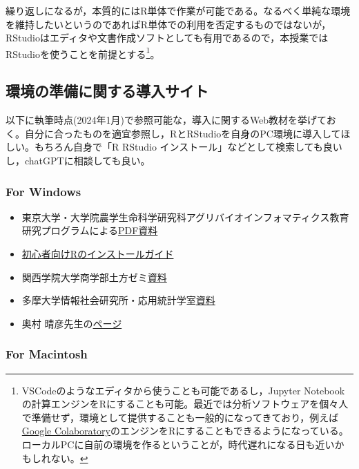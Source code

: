 \documentclass[
  a4paper,
]{ltjsbook}
\providecommand{\tightlist}{%
  \setlength{\itemsep}{0pt}\setlength{\parskip}{0pt}}\usepackage{longtable,booktabs,array}
\begin{document}
繰り返しになるが，本質的にはR単体で作業が可能である。なるべく単純な環境を維持したいというのであればR単体での利用を否定するものではないが，RStudioはエディタや文書作成ソフトとしても有用であるので，本授業ではRStudioを使うことを前提とする\footnote{VSCodeのようなエディタから使うことも可能であるし，Jupyter
  Notebookの計算エンジンをRにすることも可能。最近では分析ソフトウェアを個々人で準備せず，環境として提供することも一般的になってきており，例えば\href{https://colab.research.google.com/}{Google
  Colaboratory}のエンジンをRにすることもできるようになっている。ローカルPCに自前の環境を作るということが，時代遅れになる日も近いかもしれない。}。

\hypertarget{ux74b0ux5883ux306eux6e96ux5099ux306bux95a2ux3059ux308bux5c0eux5165ux30b5ux30a4ux30c8-1}{%
\subsection{環境の準備に関する導入サイト}\label{ux74b0ux5883ux306eux6e96ux5099ux306bux95a2ux3059ux308bux5c0eux5165ux30b5ux30a4ux30c8-1}}

以下に執筆時点(2024年1月)で参照可能な，導入に関するWeb教材を挙げておく。自分に合ったものを適宜参照し，RとRStudioを自身のPC環境に導入してほしい。もちろん自身で「R
RStudio
インストール」などとして検索しても良いし，chatGPTに相談しても良い。

\hypertarget{for-windows-1}{%
\subsubsection{For Windows}\label{for-windows-1}}

\begin{itemize}
\tightlist
\item
  東京大学・大学院農学生命科学研究科アグリバイオインフォマティクス教育研究プログラムによる\href{https://www.iu.a.u-tokyo.ac.jp/textbook/R/R1.010_win.pdf}{PDF資料}
\item
  \href{https://syunsuke.github.io/r_install_guide_for_beginners/}{初心者向けRのインストールガイド}
\item
  関西学院大学商学部土方ゼミ\href{http://soc-research.org/ja/r_install_windows/}{資料}
\item
  多摩大学情報社会研究所・応用統計学室\href{多摩大学情報社会研究所・応用統計学室}{資料}
\item
  奥村
  晴彦先生の\href{https://okumuralab.org/~okumura/stat/R-win.html}{ページ}
\end{itemize}

\hypertarget{for-macintosh-1}{%
\subsubsection{For Macintosh}\label{for-macintosh-1}}
\end{document}

